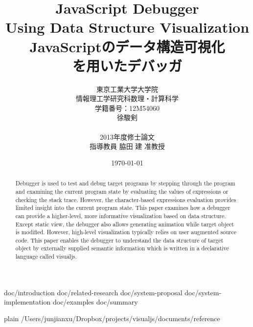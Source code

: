 \documentclass [a4paper,11pt,fleqn]{report}
\title {JavaScript Debugger\\Using Data Structure Visualization\\JavaScriptのデータ構造可視化\\を用いたデバッガ}
\author {東京工業大学大学院\\情報理工学研究科数理・計算科学\\学籍番号：12M54060\\徐駿剣\\\\2013年度修士論文\\指導教員 脇田 建 准教授}
\date {\today}
\begin{document}
\maketitle

\begin {abstract}
Debugger is used to test and debug target programs by stepping through the program and examining the current program state by evaluating the values of expressions or checking the stack trace. However, the character-based expressions evaluation provides limited insight into the current program state. This paper examines how a debugger can provide a higher-level, more informative visualization based on data structure. Except static view, the debugger also allows generating animation while target object is modified. However, high-level visualization typically relies on user augmented source code. This paper enables the debugger to understand the data structure of target object by externally supplied semantic information which is written in a declarative language called visualjs.
\end {abstract}

\tableofcontents
\listoffigures
\listoftables

 {doc/introduction}
 {doc/related-research}
 {doc/system-proposal}
 {doc/system-implementation}
 {doc/examples}
 {doc/summary}

 {plain}
 {/Users/junjianxu/Dropbox/projects/visualjs/documents/reference}
\end{document}
